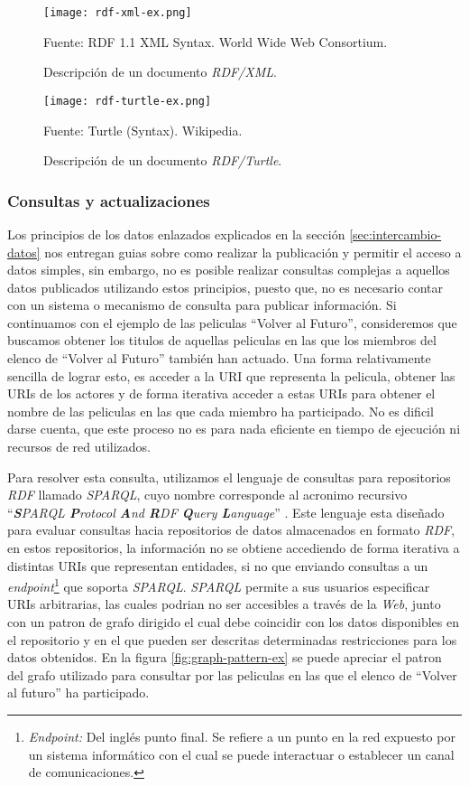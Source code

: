 \begin{figure}
    \centering
    \texttt{[image: rdf-xml-ex.png]}
    \caption{Descripción de un documento \textit{RDF/XML}.} Fuente: RDF 1.1 XML
    Syntax. World Wide Web Consortium.
    \label{fig:rdf-xml-ex}
\end{figure}

\begin{figure}
    \centering
    \texttt{[image: rdf-turtle-ex.png]}
    \caption{Descripción de un documento \textit{RDF/Turtle}.} Fuente: Turtle
    (Syntax). Wikipedia.
    \label{fig:rdf-turtle-ex}
\end{figure}

\subsubsection{Consultas y actualizaciones}

Los principios de los datos enlazados explicados en la sección
\ref{sec:intercambio-datos} nos entregan guias sobre como realizar la
publicación y permitir el acceso a datos simples, sin embargo, no es posible
realizar consultas complejas a aquellos datos publicados utilizando estos
principios, puesto que, no es necesario contar con un sistema o mecanismo de
consulta para publicar información. Si continuamos con el ejemplo de las
peliculas ``Volver al Futuro'', consideremos que buscamos obtener los titulos de
aquellas peliculas en las que los miembros del elenco de ``Volver al Futuro''
también han actuado. Una forma relativamente sencilla de lograr esto, es acceder
a la URI que representa la pelicula, obtener las URIs de los actores y de forma
iterativa acceder a estas URIs para obtener el nombre de las peliculas en las
que cada miembro ha participado. No es dificil darse cuenta, que este proceso no
es para nada eficiente en tiempo de ejecución ni recursos de red utilizados.

Para resolver esta consulta, utilizamos el lenguaje de consultas para
repositorios \textit{RDF} llamado \textit{SPARQL}, cuyo nombre corresponde al
acronimo recursivo ``\textit{\textbf{S}PARQL \textbf{P}rotocol \textbf{A}nd
\textbf{R}DF \textbf{Q}uery \textbf{L}anguage}'' \cite{world2013sparql}. Este
lenguaje esta diseñado para evaluar consultas hacia repositorios de datos
almacenados en formato \textit{RDF}, en estos repositorios, la información no se
obtiene accediendo de forma iterativa a distintas URIs que representan
entidades, si no que enviando consultas a un
\textit{endpoint}\footnote{\textit{Endpoint:} Del inglés punto final. Se refiere
a un punto en la red expuesto por un sistema informático con el cual se puede
interactuar o establecer un canal de comunicaciones.} que soporta
\textit{SPARQL}. \textit{SPARQL} permite a sus usuarios especificar URIs
arbitrarias, las cuales podrian no ser accesibles a través de la \textit{Web},
junto con un patron de grafo dirigido el cual debe coincidir con los datos
disponibles en el repositorio y en el que pueden ser descritas determinadas
restricciones para los datos obtenidos. En la figura \ref{fig:graph-pattern-ex}
se puede apreciar el patron del grafo utilizado para consultar por las peliculas
en las que el elenco de ``Volver al futuro'' ha participado.

